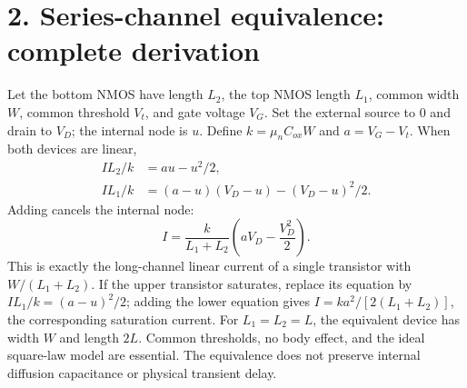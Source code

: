 \documentclass[11pt]{article}
\begin{document}
\section*{2. Series-channel equivalence: complete derivation}
Let the bottom NMOS have length $L_2$, the top NMOS length $L_1$, common width $W$, common threshold $V_t$, and gate voltage $V_G$. Set the external source to 0 and drain to $V_D$; the internal node is $u$. Define $k=\mu_n C_{ox}W$ and $a=V_G-V_t$. When both devices are linear,
\begin{align*}
I L_2/k&=au-u^2/2,\\
I L_1/k&=(a-u)(V_D-u)-(V_D-u)^2/2.
\end{align*}
Adding cancels the internal node:
\[
\boxed{I=\frac{k}{L_1+L_2}\left(aV_D-\frac{V_D^2}{2}\right).}
\]
This is exactly the long-channel linear current of a single transistor with $W/(L_1+L_2)$. If the upper transistor saturates, replace its equation by $I L_1/k=(a-u)^2/2$; adding the lower equation gives $I=k a^2/[2(L_1+L_2)]$, the corresponding saturation current. For $L_1=L_2=L$, the equivalent device has width $W$ and length $2L$. Common thresholds, no body effect, and the ideal square-law model are essential. The equivalence does not preserve internal diffusion capacitance or physical transient delay.
\end{document}
